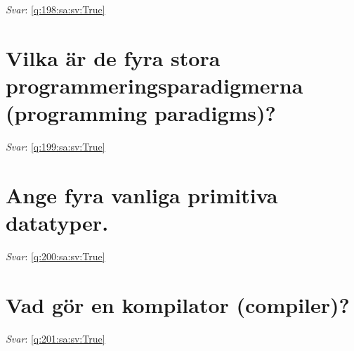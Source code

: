 \documentclass[a4paper,11pt,oneside]{book}
\begin{document}
\begin{sloppypar}
\label{q:198:sa:sv:False}

\vspace{2cm}

\noindent\makebox[\textwidth]{\hrulefill}

\vspace{1cm}

\textit{Svar}: \autoref{q:198:sa:sv:True}



\section{Vilka \"ar de fyra stora programmeringsparadigmerna (programming paradigms)?}

\label{q:199:sa:sv:False}

\vspace{2cm}

\noindent\makebox[\textwidth]{\hrulefill}

\vspace{1cm}

\textit{Svar}: \autoref{q:199:sa:sv:True}



\section{Ange fyra vanliga primitiva datatyper.}

\label{q:200:sa:sv:False}

\vspace{2cm}

\noindent\makebox[\textwidth]{\hrulefill}

\vspace{1cm}

\textit{Svar}: \autoref{q:200:sa:sv:True}



\section{Vad g\"or en kompilator (compiler)?}

\label{q:201:sa:sv:False}

\vspace{2cm}

\noindent\makebox[\textwidth]{\hrulefill}

\vspace{1cm}

\textit{Svar}: \autoref{q:201:sa:sv:True}




\end{sloppypar}
\end{document}
